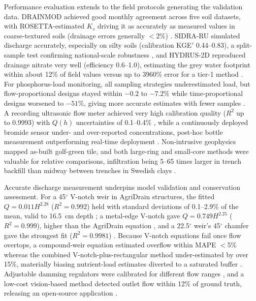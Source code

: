 Performance evaluation extends to the field protocols generating the validation data. \textsc{DRAINMOD} achieved good monthly agreement across five soil datasets, with ROSETTA-estimated $K_s$ driving it as accurately as measured values in coarse-textured soils (drainage errors generally $<$2\%) \parencite{Salazar2008}. \textsc{SIDRA-RU} simulated discharge accurately, especially on silty soils (calibration KGE$'$ 0.44--0.83), a split-sample test confirming national-scale robustness \parencite{Jeantet2021}, and HYDRUS-2D reproduced drainage nitrate very well (efficiency 0.6--1.0), estimating the grey water footprint within about 12\% of field values versus up to 3960\% error for a tier-1 method \parencite{Naderi2025}. For phosphorus-load monitoring, all sampling strategies underestimated load, but flow-proportional designs stayed within $-0.2$ to $-7.2$\% while time-proportional designs worsened to $-51$\%, giving more accurate estimates with fewer samples \parencite{Dialameh2022}. A recording ultrasonic flow meter achieved very high calibration quality ($R^2$ up to 0.9993) with $Q(h)$ uncertainties of 0.1--0.4\% \parencite{Enamorado2007}, while a continuously deployed bromide sensor under- and over-reported concentrations, post-hoc bottle measurement outperforming real-time deployment \parencite{deOliveira2023b}. Non-intrusive geophysics mapped as-built golf-green tile, and both large-ring and small-core methods were valuable for relative comparisons, infiltration being 5--65 times larger in trench backfill than midway between trenches in Swedish clays \parencite{Freeland2014,Messing2006,BUCKLAND1986}.

Accurate discharge measurement underpins model validation and conservation assessment. For a 45$^\circ$ V-notch weir in AgriDrain structures, the fitted $Q=0.011H^{2.28}$ ($R^2=0.992$) held with standard deviations of 0.1--2.9\% of the mean, valid to 16.5~cm depth \parencite{Christianson2019}; a metal-edge V-notch gave $Q=0.749H^{2.25}$ ($R^2=0.999$), higher than the AgriDrain equation \parencite{BinShokrana2021}, and a 22.5$^\circ$ weir's 45$^\circ$ chamfer gave the strongest fit ($R^2=0.9981$) \parencite{Napierala2023}. Because V-notch equations fail once flow overtops, a compound-weir equation estimated overflow within MAPE $<$5\% whereas the combined V-notch-plus-rectangular method under-estimated by over 15\%, materially biasing nutrient-load estimates diverted to a saturated buffer \parencite{Katuwal2024}. Adjustable damming regulators were calibrated for different flow ranges \parencite{Popek2021}, and a low-cost vision-based method detected outlet flow within 12\% of ground truth, releasing an open-source application \parencite{Young2023}.

